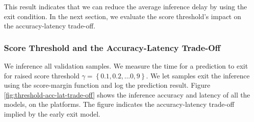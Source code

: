 This result indicates that we can reduce the average inference delay by using the exit condition. In the next section, we evaluate the score threshold's impact on the accuracy-latency trade-off.
\subsubsection{Score Threshold and the Accuracy-Latency Trade-Off}
We inference all validation samples. We measure the time for a prediction to exit for raised score threshold $ \gamma = \left\{0.1, 0.2, \dots 0,9\right\} $. We let samples exit the inference using the score-margin function and log the prediction result. Figure \ref{fig:threshold-acc-lat-trade-off} shows the inference accuracy and latency of all the models, on the platforms. The figure indicates the accuracy-latency trade-off implied by the early exit model.
